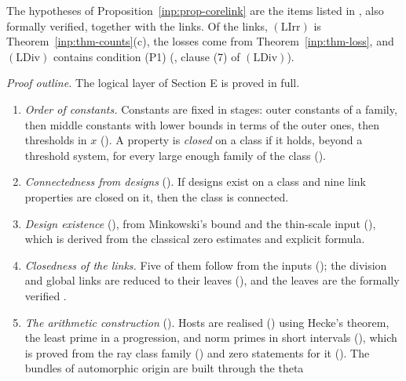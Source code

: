 \documentclass[10pt]{amsart}
\theoremstyle{definition}
\theoremstyle{remark}
\begin{document}
\noindent The hypotheses of Proposition~\ref{inp:prop-corelink} are the
items listed in \cite[Proposition~\ref{A-i4:Lprop-fam}(b)]{Annex}, also
formally verified, together with the links. Of the links,
$(\mathrm{LIrr})$ is Theorem~\ref{inp:thm-counts}(c), the losses come from
Theorem~\ref{inp:thm-loss}, and $(\mathrm{LDiv})$ contains condition (P1)
(\cite[\S\ref{A-i4:ssec-hyps}]{Annex}, clause (7) of $(\mathrm{LDiv})$).

\emph{Proof outline.} The logical layer of Section E is proved in full.
\begin{enumerate}
\item \emph{Order of constants.} Constants are fixed in stages: outer
constants of a family, then middle constants with lower bounds in terms of
the outer ones, then thresholds in $x$
(\cite[\S\ref{A-i4:ssec-closed}]{Annex}). A property is \emph{closed} on a
class if it holds, beyond a threshold system, for every large enough
family of the class (\cite[Definition~\ref{A-i4:def-closed}]{Annex}).
\item \emph{Connectedness from designs}
(\cite[Theorem~\ref{A-i4:thm-desWin}]{Annex}). If designs exist on a class
and nine link properties are closed on it, then the class is connected.
\item \emph{Design existence} (\cite[Theorems~\ref{A-i4:thm-choices}
and~\ref{A-i4:thm-design}]{Annex}), from Minkowski's bound and the thin-scale
input (\cite[Proposition~\ref{A-i4:thm-litthin}]{Annex}), which is derived
from the classical zero estimates and explicit formula.
\item \emph{Closedness of the links.} Five of them follow from the
inputs (\cite[Proposition~\ref{A-i4:prop-links-proved}]{Annex}); the
division and global links are reduced to their leaves
(\cite[Propositions~\ref{A-i4:prop-links-formal}
and~\ref{A-i4:prop-links-leaves}]{Annex}), and the leaves are the formally
verified \cite[Propositions~\ref{A-i4:Lprop-sel}, \ref{A-i4:Lprop-D},
\ref{A-i4:Lprop-pkg}, \ref{A-i4:Lprop-forms}, \ref{A-i4:Lprop-fam}]{Annex}.
\item \emph{The arithmetic construction}
(\cite[\S\ref{A-i4:ssec-arith}]{Annex}). Hosts are realised
(\cite[Theorem~\ref{A-i4:thm-realise}]{Annex}) using Hecke's theorem, the
least prime in a progression, and norm primes in short intervals
(\cite[Proposition~\ref{A-i4:thm-shortnorm}]{Annex}), which is proved from
the ray class family (\cite[Proposition~\ref{A-i4:prop-lfam-ray}]{Annex})
and zero statements for it (\cite[Proposition~\ref{A-i4:prop-lfam-zeros}]{Annex}).
The bundles of automorphic origin are built through the theta

\end{enumerate}
\end{document}

